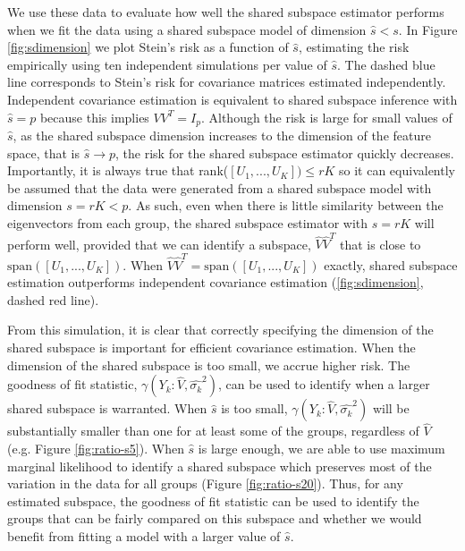 \documentclass{statsoc}
\begin{document}
We use these data to evaluate how well the shared subspace estimator
performs when we fit the data using a shared subspace model of
dimension $\hat{s} < s$.  In Figure \ref{fig:sdimension} we plot
Stein's risk as a function of $\hat{s}$, estimating the risk
empirically using ten independent simulations per value of $\hat{s}$.
The dashed blue line corresponds to Stein's risk for covariance
matrices estimated independently.  Independent covariance estimation
is equivalent to shared subspace inference with $\hat{s} = p$ because
this implies $VV^T = I_p$.  Although the risk is large for small
values of $\hat{s}$, as the shared subspace dimension increases to the
dimension of the feature space, that is $\hat{s} \rightarrow p$, the
risk for the shared subspace estimator quickly decreases.
Importantly, it is always true that rank($[U_1, ..., U_K]) \leq rK$ so
it can equivalently be assumed that the data were generated from a
shared subspace model with dimension $s = rK < p$.  As such, even when
there is little similarity between the eigenvectors from each group,
the shared subspace estimator with $\hat{s} = rK$ will perform well,
provided that we can identify a subspace, $\hat{V}\hat{V}^T$ that is
close to $\text{span}([U_1, ..., U_K])$. When
$\hat{V}\hat{V}^T = \text{span}([U_1, ..., U_K])$ exactly, shared
subspace estimation outperforms independent covariance estimation
(\ref{fig:sdimension}, dashed red line).

From this simulation, it is clear that correctly specifying the
dimension of the shared subspace is important for efficient covariance
estimation.  When the dimension of the shared subspace is too small,
we accrue higher risk.  The goodness of fit statistic,
$\gamma(Y_k: \hat{V}, \hat{\sigma_k}^2)$, can be used to identify when
a larger shared subspace is warranted.  When $\hat{s}$ is too small,
$\gamma(Y_k: \hat{V}, \hat{\sigma_k}^2)$ will be substantially smaller
than one for at least some of the groups, regardless of $\hat{V}$
(e.g. Figure \ref{fig:ratio-s5}).  When $\hat{s}$ is large enough, we
are able to use maximum marginal likelihood to identify a shared
subspace which preserves most of the variation in the data for all
groups (Figure \ref{fig:ratio-s20}).  Thus, for any estimated
subspace, the goodness of fit statistic can be used to identify the
groups that can be fairly compared on this subspace and whether we
would benefit from fitting a model with a larger value of $\hat{s}$.

\end{document}
